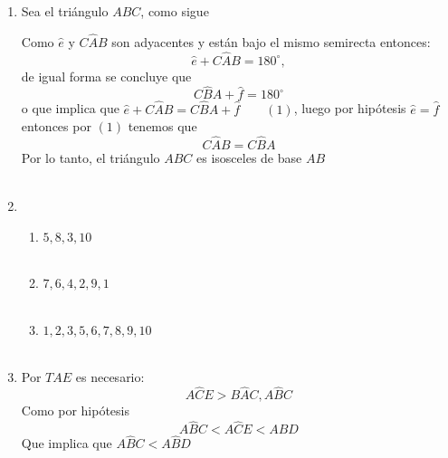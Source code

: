 \begin{enumerate}[\bfseries 1.]
\item Sea el triángulo $ABC$, como sigue 

\begin{center}
\end{center}

    Como $\widehat{e}$ y $C\widehat{A}B$ son adyacentes y están bajo el mismo semirecta entonces: $$\widehat{e} + C\widehat{A}B = 180^{\circ},$$ de igual forma se concluye que $$C\widehat{B}A + \widehat{f} = 180^{\circ}$$ o que implica que $\widehat{e} + C\widehat{A}B = C\widehat{B}A + \widehat{f} \qquad (1)$, luego por hipótesis $\widehat{e} = \widehat{f}$ entonces por $(1)$ tenemos que $$C\widehat{A}B = C\widehat{B}A$$ Por lo tanto, el triángulo $ABC$ es isosceles de base $AB$\\\\

\item 
\begin{enumerate}[\bfseries a)]
    
    \item $5,8,3,10$\\\\

    \item $7,6,4,2,9,1$\\\\

    \item $1,2,3,5,6,7,8,9,10$\\\\

\end{enumerate}

\item Por $TAE$ es necesario: $$A\widehat{C}E > B\widehat{A}C, A\widehat{B}C$$ Como por hipótesis $$A\widehat{B}C < A\widehat{C}E < A \widehat{B}D$$ Que implica que $A\widehat{B}C< A\widehat{B}D$\\\\ 


\end{enumerate}

